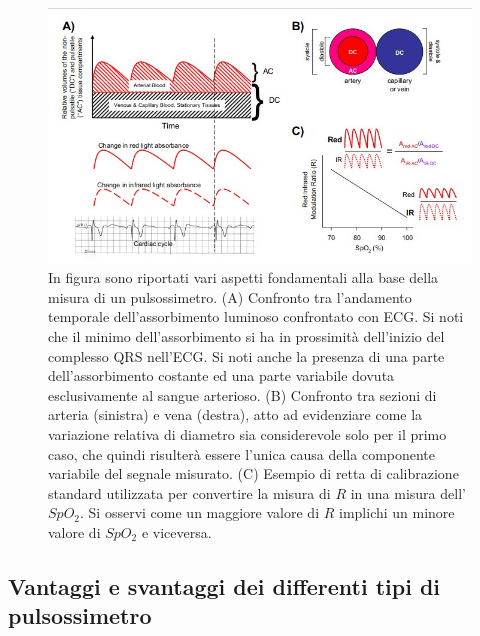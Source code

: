 \documentclass[12pt,a4paper, twoside, openright]{report}
\begin{document}
\begin{figure}[h!]
    \centering
    \includegraphics[width=\textwidth]{ACDC.jpg}
    \caption{In figura sono riportati vari aspetti fondamentali alla base della misura 					 di un pulsossimetro. 
   		     (A) Confronto tra l'andamento temporale dell'assorbimento luminoso 						 confrontato con ECG. 
 		     Si noti che il minimo dell'assorbimento si ha in prossimità dell'inizio 					 del complesso QRS nell'ECG. 
		     Si noti anche la presenza di una parte dell'assorbimento costante ed una 					 parte variabile dovuta esclusivamente al sangue arterioso. 
 		     (B) Confronto tra sezioni di arteria (sinistra) e vena (destra), atto ad 					 evidenziare come la variazione relativa di diametro sia considerevole solo 			 per il primo caso, che quindi risulterà essere l'unica causa della 						 componente variabile del segnale misurato. 
  		     (C) Esempio di retta di calibrazione standard utilizzata per convertire la 			 misura di $R$ in una misura dell'$SpO_2$. 
 		     Si osservi come un maggiore valore di $R$ implichi un minore valore di 					 $SpO_2$ e viceversa.}
    \label{fig:ACDC}
\end{figure}


\subsection{Vantaggi e svantaggi dei differenti tipi di pulsossimetro}
\end{document}

